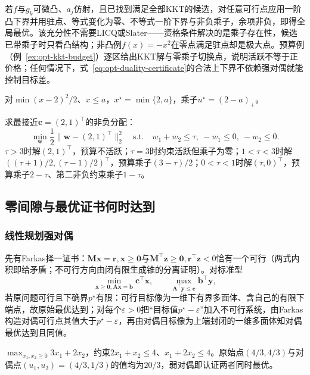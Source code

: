 若$f$与$g_k$可微凸、$a_j$仿射，且已找到满足全部KKT的候选，对任意可行点应用一阶凸下界并用驻点、等式变化为零、不等式一阶下界与非负乘子，余项非负，即得全局最优。该充分性不需要LICQ或Slater——资格条件解决的是乘子存在性，候选已带乘子时只看凸结构；非凸例$f(x)=-x^2$在零点满足驻点却是极大点。预算例（例~\ref{ex:opt-kkt-budget}）逐区给出KKT解与零乘子切换点，说明活跃不等于正价格；任何情况下，式~\eqref{eq:opt-duality-certificate}的合法上下界不依赖强对偶就能控制目标差。

\begin{example}[活跃约束与预算例]
\label{ex:opt-scalar-active-constraint}
对$\min(x-2)^2/2$、$x\leq a$，$x^\star=\min\{2,a\}$，乘子$u^\star=(2-a)_+$。
\end{example}

\begin{example}[非负预算分配]
\label{ex:opt-kkt-budget}
求最接近$\bm c=(2,1)^\top$的非负分配：
\[
 \min_{\bm w}\frac12\|\bm w-(2,1)^\top\|_2^2
 \quad\text{s.t.}\quad w_1+w_2\leq\tau,\ -w_1\leq0,\ -w_2\leq0.
\]
$\tau>3$时解$(2,1)^\top$，预算不活跃；$\tau=3$时约束活跃但乘子为零；$1<\tau<3$时解$((\tau+1)/2,(\tau-1)/2)^\top$，预算乘子$(3-\tau)/2$；$0<\tau<1$时解$(\tau,0)^\top$，预算乘子$2-\tau$、第二非负约束乘子$1-\tau$。
\end{example}

\subsection{零间隙与最优证书何时达到}

\subsubsection{线性规划强对偶}

先有Farkas择一证书：$\bm M\bm x=\bm r,\bm x\geq\bm0$与$\bm M^\top\bm z\geq\bm0,\bm r^\top\bm z<0$恰有一个可行（两式内积即给矛盾；不可行方向由闭有限生成锥的分离证明）。对标准型
\[
 \min_{\bm x\geq\bm0,\bm A\bm x=\bm b}\bm c^\top\bm x,\qquad
 \max_{\bm A^\top\bm y\leq\bm c}\bm b^\top\bm y,
\]
若原问题可行且下确界$p^\star$有限：可行目标像为一维下有界多面体、含自己的有限下端点，故原始最优达到；对每个$\varepsilon>0$把“目标值$p^\star-\varepsilon$”加入不可行系统，由Farkas构造对偶可行点其值大于$p^\star-\varepsilon$，再由对偶目标像为上端封闭的一维多面体知对偶最优达到且同值。

\begin{example}[二维资源分配]
\label{ex:opt-resource-lp-duality}
$\max_{x_1,x_2\geq0}3x_1+2x_2$，约束$2x_1+x_2\leq4$、$x_1+2x_2\leq4$。原始点$(4/3,4/3)$与对偶点$(u_1,u_2)=(4/3,1/3)$的值均为$20/3$，弱对偶即认证两者同时最优。
\end{example}

